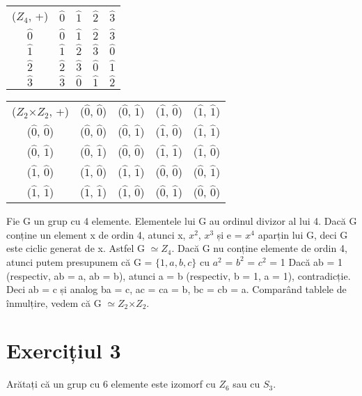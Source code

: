 \documentclass{article}
\begin{document}
\begin{center}
\begin{tabular}{ c c c c c }
 ($Z_4$, +) & $\hat{0}$ & $\hat{1}$ & $\hat{2}$ & $\hat{3}$ \\ 
 $\hat{0}$ & $\hat{0}$ & $\hat{1}$ & $\hat{2}$ & $\hat{3}$ \\  
 $\hat{1}$ & $\hat{1}$ & $\hat{2}$ & $\hat{3}$ &  $\hat{0}$ \\  
 $\hat{2}$ & $\hat{2}$ & $\hat{3}$ &  $\hat{0}$ & $\hat{1}$ \\  
 $\hat{3}$ & $\hat{3}$ & $\hat{0}$ &  $\hat{1}$ & $\hat{2}$\\  
\end{tabular}
\end{center}

\begin{center}
\begin{tabular}{ c c c c c }
 ($Z_2$×$Z_2$, +) & ($\hat{0}$, $\hat{0}$) & ($\hat{0}$, $\hat{1}$) & ($\hat{1}$, $\hat{0}$) & ($\hat{1}$, $\hat{1}$) \\ 
 ($\hat{0}$, $\hat{0}$) & ($\hat{0}$, $\hat{0}$) & ($\hat{0}$, $\hat{1}$) & ($\hat{1}$, $\hat{0}$) & ($\hat{1}$, $\hat{1}$) \\  
 ($\hat{0}$, $\hat{1}$) & ($\hat{0}$, $\hat{1}$) & ($\hat{0}$, $\hat{0}$) & ($\hat{1}$, $\hat{1}$) &  ($\hat{1}$, $\hat{0}$) \\  
 ($\hat{1}$, $\hat{0}$) & ($\hat{1}$, $\hat{0}$) & ($\hat{1}$, $\hat{1}$) &  ($\hat{0}$, $\hat{0}$) & ($\hat{0}$, $\hat{1}$) \\  
 ($\hat{1}$, $\hat{1}$) & ($\hat{1}$, $\hat{1}$) & ($\hat{1}$, $\hat{0}$) &  ($\hat{0}$, $\hat{1}$) &  ($\hat{0}$, $\hat{0}$)\\  
\end{tabular}
\end{center}

Fie G un grup cu 4 elemente. Elementele lui G au ordinul divizor al lui 4. Dacă G conține un element x de ordin 4, atunci x, $x^2$, $x^3$ și e = $x^4$ aparțin lui G, deci G este ciclic generat de x. Astfel G  $\simeq Z_4$. 
\newline
Dacă G nu conține elemente de ordin 4, atunci putem presupunem că G = $\{1, a, b, c\}$ cu $a^2$ = $b^2$ = $c^2$ = 1
Dacă ab = 1 (respectiv, ab = a, ab = b), atunci a = b (respectiv, b = 1, a = 1), contradicție.
Deci ab = c și analog ba = c, ac = ca = b, bc = cb = a. Comparând tablele de înmulțire, vedem că G $ \simeq Z_2$×$Z_2$.


\section{Exercițiul 3}
Arătați că un grup cu 6 elemente este izomorf cu $Z_6$ sau cu $S_3$. 
\end{document}
